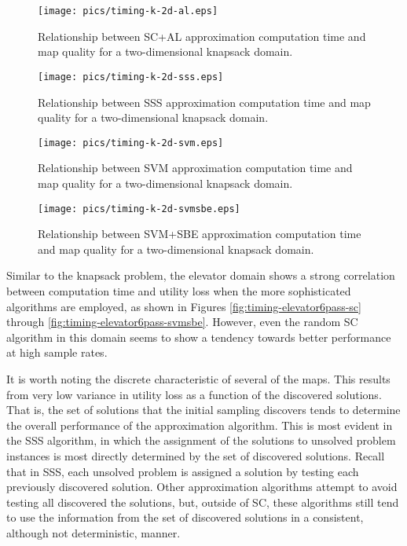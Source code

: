 \begin{figure}
\begin{center}
\texttt{[image: pics/timing-k-2d-al.eps]}
\caption{Relationship between SC+AL approximation computation time and map quality for a two-dimensional knapsack domain.}
\label{fig:timing-k-2d-al}
\end{center}
\end{figure}

\begin{figure}
\begin{center}
\texttt{[image: pics/timing-k-2d-sss.eps]}
\caption{Relationship between SSS approximation computation time and map quality for a two-dimensional knapsack domain.}
\label{fig:timing-k-2d-sss}
\end{center}
\end{figure}


\begin{figure}
\begin{center}
\texttt{[image: pics/timing-k-2d-svm.eps]}
\caption{Relationship between SVM approximation computation time and map quality for a two-dimensional knapsack domain.}
\label{fig:timing-k-2d-svm}
\end{center}
\end{figure}

\begin{figure}
\begin{center}
\texttt{[image: pics/timing-k-2d-svmsbe.eps]}
\caption{Relationship between SVM+SBE approximation computation time and map quality for a two-dimensional knapsack domain.}
\label{fig:timing-k-2d-svmsbe}
\end{center}
\end{figure}

Similar to the knapsack problem,  the elevator domain shows a strong correlation between computation time and utility loss when the more sophisticated algorithms are employed, as shown in Figures \ref{fig:timing-elevator6pass-sc} through \ref{fig:timing-elevator6pass-svmsbe}.  However, even the random SC algorithm in this domain seems to show a tendency towards better performance at high sample rates.


It is worth noting the discrete characteristic of several of the maps.  This results from very low variance in utility loss as a function of the discovered solutions.  That is, the set of solutions that the initial sampling discovers tends to determine the overall performance of the approximation algorithm.  This is most evident in the SSS algorithm, in which the assignment of the solutions to unsolved problem instances is most directly determined by the set of discovered solutions.  Recall that in SSS, each unsolved problem is assigned a solution by testing each previously discovered solution.  Other approximation algorithms attempt to avoid testing all discovered  the solutions, but, outside of SC, these algorithms still tend to use the information from the set of discovered solutions in a consistent, although not deterministic, manner.

